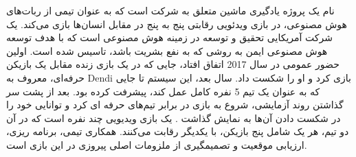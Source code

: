    نام یک پروژه یادگیری ماشین متعلق به شرکت 
   است که به عنوان تیمی از ربات‌های هوش مصنوعی،  در بازی ویدئویی رقابتی پنج به پنج 
     در مقابل انسان‌ها بازی می‌کند.
 یک شرکت آمریکایی تحقیق و توسعه در زمینه هوش مصنوعی است که با هدف توسعه هوش مصنوعی ایمن به روشی که به نفع بشریت باشد، تاسیس شده است. اولین حضور عمومی
  در سال 2017 اتفاق افتاد، جایی که در یک بازی زنده مقابل یک بازیکن حرفه‌ای، معروف به Dendi بازی کرد و او را شکست داد. سال بعد، این سیستم تا جایی که به عنوان یک تیم 5 نفره کامل عمل کند، پیشرفت کرده بود. 
  بعد از پشت سر گذاشتن روند آزمایشی، شروع به بازی در برابر تیم‌های حرفه ای کرد و توانایی خود را در شکست دادن آن‌ها به نمایش گذاشت
  \cite{openai}. 
  یک بازی ویدیویی چند نفره است که در آن دو تیم، هر یک شامل پنج بازیکن، با یکدیگر رقابت می‌کنند. همکاری تیمی، برنامه ریزی، ارزیابی موقعیت و تصمیم\nf گیری از ملزومات اصلی پیروزی در این بازی است.
   
   
   

%
  
  

